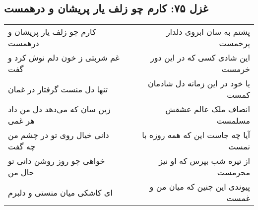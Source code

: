 \begin{center}
\section*{غزل ۷۵: کارم چو زلف یار پریشان و درهمست}
\label{sec:075}
\begin{longtable}{l p{0.5cm} r}
کارم چو زلف یار پریشان و درهمست
&&
پشتم به سان ابروی دلدار پرخمست
\\
غم شربتی ز خون دلم نوش کرد و گفت
&&
این شادی کسی که در این دور خرمست
\\
تنها دل منست گرفتار در غمان
&&
یا خود در این زمانه دل شادمان کمست
\\
زین سان که می‌دهد دل من داد هر غمی
&&
انصاف ملک عالم عشقش مسلمست
\\
دانی خیال روی تو در چشم من چه گفت
&&
آیا چه جاست این که همه روزه با نمست
\\
خواهی چو روز روشن دانی تو حال من
&&
از تیره شب بپرس که او نیز محرمست
\\
ای کاشکی میان منستی و دلبرم
&&
پیوندی این چنین که میان من و غمست
\\
\end{longtable}
\end{center}
